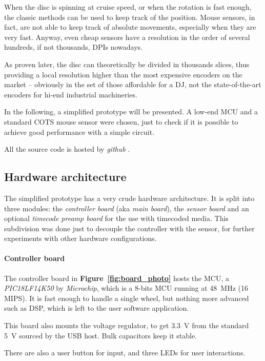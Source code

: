 \documentclass[a4paper,10pt]{article}
\newcommand{\citef}[1]{\textbf{Figure~\ref{#1}}}
\begin{document}
\begin{multicols}{2}
When the disc is spinning at cruise speed, or when the rotation is fast
enough, the classic methods can be used to keep track of the position.
Mouse sensors, in fact, are not able to keep track of absolute movements,
especially when they are very fast. Anyway, even cheap sensors have a
resolution in the order of several hundreds, if not thousands, DPIs nowadays.

As proven later, the disc can theoretically be divided in thousands slices,
thus providing a local resolution higher than the most expensive encoders on
the market -- obviously in the set of those affordable for a DJ, not the
state-of-the-art encoders for hi-end industrial machineries.

In the following, a simplified prototype will be presented. A low-end MCU and
a standard COTS mouse sensor were chosen, just to check if it is possible to
achieve good performance with a simple circuit.

All the source code is hosted by \emph{github} \cite{github_ratt}.


\subsection{Hardware architecture}

The simplified prototype has a very crude hardware architecture. It is split
into three modules: the \emph{controller board} (aka \emph{main board}), the
\emph{sensor board} and an optional \emph{timecode preamp board} for the use
with timecoded media. This subdivision was done just to decouple the
controller with the sensor, for further experiments with other hardware
configurations.


\paragraph{Controller board}
The controller board in \citef{fig:board_photo} hosts the MCU, a
\emph{PIC18LF14K50} \cite{microchip_pic18lf14k50} by \emph{Microchip}, which
is a 8-bits MCU running at 48~MHz (16 MIPS). It is fast enough to handle a
single wheel, but nothing more advanced such as DSP, which is left to the
user software application.

This board also mounts the voltage regulator, to get 3.3~V from the standard
5~V sourced by the USB host. Bulk capacitors keep it stable.

There are also a user button for input, and three LEDs for user interactions.


\end{multicols}
\end{document}
